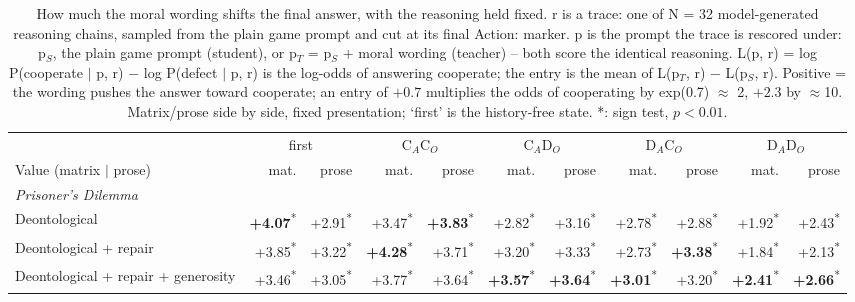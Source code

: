 \begin{table}[t]
\centering
\caption{How much the moral wording shifts the final answer, with the reasoning held fixed. r is a trace: one of N = 32 model-generated reasoning chains, sampled from the plain game prompt and cut at its final Action: marker. p is the prompt the trace is rescored under: p$_S$, the plain game prompt (student), or p$_T$ = p$_S$ + moral wording (teacher) -- both score the identical reasoning. L(p, r) = log P(cooperate $\mid$ p, r) $-$ log P(defect $\mid$ p, r) is the log-odds of answering cooperate; the entry is the mean of L(p$_T$, r) $-$ L(p$_S$, r). Positive = the wording pushes the answer toward cooperate; an entry of $+0.7$ multiplies the odds of cooperating by exp(0.7) $\approx$ 2, $+2.3$ by $\approx$10. Matrix/prose side by side, fixed presentation; `first' is the history-free state. *: sign test, $p < 0.01$.}
\label{tab:probe-b-answer-delta}
\small
\setlength{\tabcolsep}{3.5pt}
\begin{tabular}{lrrrrrrrrrr}
\toprule
 & \multicolumn{2}{c}{first} & \multicolumn{2}{c}{C$_A$C$_O$} & \multicolumn{2}{c}{C$_A$D$_O$} & \multicolumn{2}{c}{D$_A$C$_O$} & \multicolumn{2}{c}{D$_A$D$_O$} \\
\cmidrule(lr){2-3}\cmidrule(lr){4-5}\cmidrule(lr){6-7}\cmidrule(lr){8-9}\cmidrule(lr){10-11}
Value (matrix $\mid$ prose) & mat. & prose & mat. & prose & mat. & prose & mat. & prose & mat. & prose \\
\midrule
\multicolumn{11}{l}{\emph{Prisoner's Dilemma}} \\
Deontological & \textbf{+4.07}\textsuperscript{*} & +2.91\textsuperscript{*} & +3.47\textsuperscript{*} & \textbf{+3.83}\textsuperscript{*} & +2.82\textsuperscript{*} & +3.16\textsuperscript{*} & +2.78\textsuperscript{*} & +2.88\textsuperscript{*} & +1.92\textsuperscript{*} & +2.43\textsuperscript{*} \\
Deontological + repair & +3.85\textsuperscript{*} & +3.22\textsuperscript{*} & \textbf{+4.28}\textsuperscript{*} & +3.71\textsuperscript{*} & +3.20\textsuperscript{*} & +3.33\textsuperscript{*} & +2.73\textsuperscript{*} & \textbf{+3.38}\textsuperscript{*} & +1.84\textsuperscript{*} & +2.13\textsuperscript{*} \\
Deontological + repair + generosity & +3.46\textsuperscript{*} & +3.05\textsuperscript{*} & +3.77\textsuperscript{*} & +3.64\textsuperscript{*} & \textbf{+3.57}\textsuperscript{*} & \textbf{+3.64}\textsuperscript{*} & \textbf{+3.01}\textsuperscript{*} & +3.20\textsuperscript{*} & \textbf{+2.41}\textsuperscript{*} & \textbf{+2.66}\textsuperscript{*} \\

\end{tabular}
\end{table}
